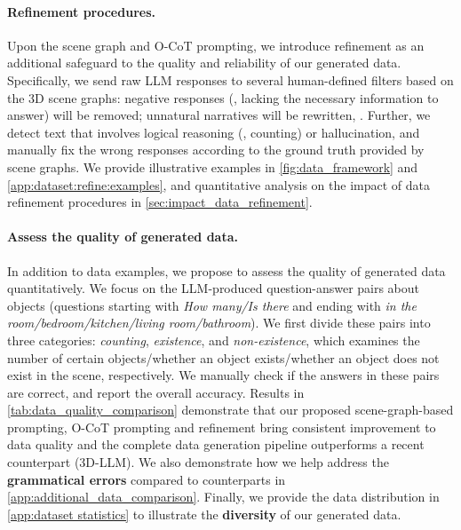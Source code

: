 \documentclass{article}
\begin{document}
\paragraph{Refinement procedures.} Upon the scene graph and O-CoT prompting, we introduce refinement as an additional safeguard to the quality and reliability of our generated data. Specifically, we send raw LLM responses to several human-defined filters based on the 3D scene graphs: negative responses (\eg, lacking the necessary information to answer) will be removed; unnatural narratives will be rewritten, \etc. Further, we detect text that involves logical reasoning (\eg, counting) or hallucination, and manually fix the wrong responses according to the ground truth provided by scene graphs. We provide illustrative examples in \cref{fig:data_framework} and \cref{app:dataset:refine:examples}, and quantitative analysis on the impact of data refinement procedures in \cref{sec:impact_data_refinement}. %




\paragraph{Assess the quality of generated data.} In addition to data examples, we propose to assess the quality of generated data quantitatively. We focus on the LLM-produced question-answer pairs about objects (questions starting with \textit{How many/Is there} and ending with \textit{in the room/bedroom/kitchen/living room/bathroom}). We first divide these pairs into three categories: \textit{counting}, \textit{existence}, and \textit{non-existence}, which examines the number of certain objects/whether an object exists/whether an object does not exist in the scene, respectively. We manually check if the answers in these pairs are correct, and report the overall accuracy. Results in \cref{tab:data_quality_comparison} demonstrate that our proposed scene-graph-based prompting, O-CoT prompting and refinement bring consistent improvement to data quality and the complete data generation pipeline outperforms a recent counterpart (3D-LLM). We also demonstrate how we help address the \textbf{grammatical errors} compared to counterparts in \cref{app:additional_data_comparison}. Finally, we provide the data distribution in \cref{app:dataset statistics} to illustrate the \textbf{diversity} of our generated data. 
\end{document}
